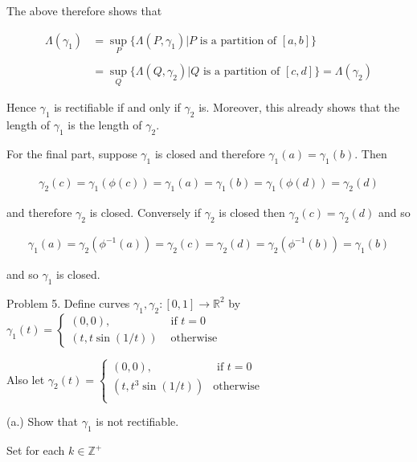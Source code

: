 \documentclass{article}
\begin{document}
  The above therefore shows that 

  \begin{align*}
    \Lambda(\gamma_1) &= \sup_{P}\{\Lambda(P,\gamma_1)|P\text{ is a partition of } [a,b]\} \\\\
    &= \sup_{Q}\{\Lambda(Q,\gamma_2)|Q \text{ is a partition of } [c,d]\} = \Lambda(\gamma_2)
  \end{align*}

  Hence $\gamma_1$ is rectifiable if and only if $\gamma_2$ is.  Moreover, this already shows that the length of $\gamma_1$ is the length of $\gamma_2$.  

  \vspace{1cm}

  For the final part, suppose $\gamma_1$ is closed and therefore $\gamma_1(a)=\gamma_1(b)$.  Then 
  
  \begin{align*}
    \gamma_2(c) = \gamma_1(\phi(c)) = \gamma_1(a)=\gamma_1(b) = \gamma_1(\phi(d))=\gamma_2(d)
  \end{align*}

  and therefore $\gamma_2$ is closed.  Conversely if $\gamma_2$ is closed then $\gamma_2(c)=\gamma_2(d)$ and so 

  \begin{align*}
    \gamma_1(a) = \gamma_2(\phi^{-1}(a))= \gamma_2(c)=\gamma_2(d) = \gamma_2(\phi^{-1}(b))=\gamma_1(b)
  \end{align*}

  and so $\gamma_1$ is closed.  

  \pagebreak

  {\Large \color{Sepia} Problem 5. Define curves $\gamma_1,\gamma_2:[0,1]\to \mathbb R^2$ by $\gamma_1(t)=\begin{cases}
    (0,0), & \text{ if } t=0\\
    \left(t,t\sin(1/t)\right) & \text{ otherwise }
\end{cases}$

Also let $\gamma_2(t) = \begin{cases}
(0,0), & \text{ if } t=0\\
(t,t^3\sin(1/t)) &\text{otherwise}\\
\end{cases} $

  (a.) Show that $\gamma_1$ is not rectifiable.}

  \vspace{1cm}

  Set for each $k\in\mathbb Z^+$
  
\end{document}
